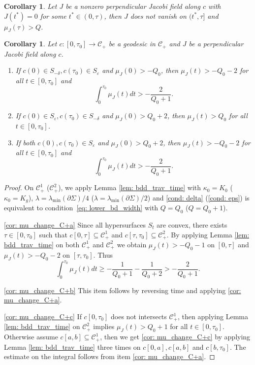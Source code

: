 \documentclass[10pt]{amsart}
\newenvironment{enumeratea}
{\bgroup\def\theenumi{\alph{enumi}}\begin{enumerate}}
{\end{enumerate}\egroup}
\newtheorem{corollary}[theorem]{Corollary}
\theoremstyle{definition}
\let\eps\varepsilon
\renewcommand{\>}{{\rangle}}
\newcommand{\<}{{\langle}}
\begin{document}
\begin{corollary}\label{cor: inf_at_C1}
Let $J$ be a nonzero perpendicular Jacobi field along $c$ with $J(t^*)=0$ for some $t^*\in(0,\tau)$, then $J$ does not vanish on $(t^*,\tau]$ and $\mu_J(\tau)>Q$.
\end{corollary}

\begin{corollary}\label{cor: mu_change_C+}
Let $c:[0,\tau_0]\to \mathcal{C}_+$ be a geodesic in $\mathcal{C}_+$ and $J$ be a perpendicular Jacobi field along $c$.

\begin{enumeratea}
\item\label{cor: mu_change_C+a}
If $c(0)\in S_{-\delta}, c(\tau_0)\in S_{\eps}$ and $\mu_J(0)>-Q_0$, then $\mu_J(t)>-Q_0-2$ for all $t\in [0,\tau_0]$ and
\[
\int_0^{\tau_0} \mu_J(t)dt> -\frac{2}{Q_0+1}.
\]

\item\label{cor: mu_change_C+b}
If $c(0)\in S_{\eps}, c(\tau_0)\in S_{-\delta}$ and $\mu_J(0)>Q_0+2$, then $\mu_J(t)>Q_0$ for all $t\in [0,\tau_0]$.

\item\label{cor: mu_change_C+c}
If both $c(0), c(\tau_0)\in S_{\eps}$ and $\mu_J(0)>Q_0+2$, then $\mu_J(t)>-Q_0-2$ for all $t\in [0,\tau_0]$ and
\[
\int_0^{\tau_0} \mu_J(t)dt> -\frac{2}{Q_0+1}.
\]
\end{enumeratea}
\end{corollary}

\begin{proof}
On $\mathcal{C}_+^1$ (\resp $\mathcal{C}_+^2$), we apply Lemma \ref{lem: bdd_trav_time} with $\kappa_0=K_0$ (\resp $\kappa_0=K_g$), $\lambda=\lambda_{\min}(\partial\Sigma)/4$ (\resp $\lambda=\lambda_{\min}(\partial\Sigma)/2$) and \eqref{cond: delta} (\resp \eqref{cond: eps}) is equivalent to condition~\eqref{eq: lower_bd_width} with $Q=Q_0$ (\resp $Q=Q_0+1$).

\eqref{cor: mu_change_C+a} Since all hypersurfaces $S_t$ are convex, there exists $\tau\!\in\! [0,\tau_0]$ such that $c[0,\tau]\!\subseteq\! \mathcal{C}_+^1$ and $c[\tau, \tau_0]\subseteq \mathcal{C}_+^2$. By applying Lemma \ref{lem: bdd_trav_time} on both $\mathcal{C}_+^1$ and $\mathcal{C}_+^2$ we obtain $\mu_J(t)>-Q_0-1$ on $[0,\tau]$ and $\mu_J(t)>-Q_0-2$ on $[\tau, \tau_0]$. Thus
\[
\int_0^{\tau_0} \mu_J(t)dt\geq -\frac{1}{Q_0+1}-\frac{1}{Q_0+2}> -\frac{2}{Q_0+1}.
\]

\eqref{cor: mu_change_C+b} This item follows by reversing time and applying \eqref{cor: mu_change_C+a}.

\eqref{cor: mu_change_C+c} If $c[0,\tau_0]$ does not intersects $\mathcal{C}_+^1$, then applying Lemma \ref{lem: bdd_trav_time} on $\mathcal{C}_+^2$ implies $\mu_J(t)>Q_0+1$ for all $t\in [0,\tau_0]$. Otherwise assume $c[a, b]\subseteq \mathcal{C}_+^1$, then we get \eqref{cor: mu_change_C+c} by applying Lemma \ref{lem: bdd_trav_time} three times on $c[0,a], c[a,b]$ and $c[b,\tau_0]$. The estimate on the integral follows from item \eqref{cor: mu_change_C+a}.
\end{proof}
\end{document}
